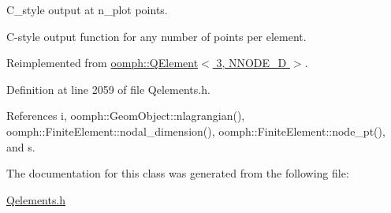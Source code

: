 C\+\_\+style output at n\+\_\+plot points. 

C-\/style output function for any number of points per element. 

Reimplemented from \hyperlink{classoomph_1_1QElement_3_013_00_01NNODE__1D_01_4_a48a7cbdd3fb6baaeed2f009ef4d1985b}{oomph\+::\+Q\+Element$<$ 3, N\+N\+O\+D\+E\+\_\+D $>$}.



Definition at line 2059 of file Qelements.\+h.



References i, oomph\+::\+Geom\+Object\+::nlagrangian(), oomph\+::\+Finite\+Element\+::nodal\+\_\+dimension(), oomph\+::\+Finite\+Element\+::node\+\_\+pt(), and s.



The documentation for this class was generated from the following file\+:\begin{DoxyCompactItemize}
\item 
\hyperlink{Qelements_8h}{Qelements.\+h}\end{DoxyCompactItemize}
